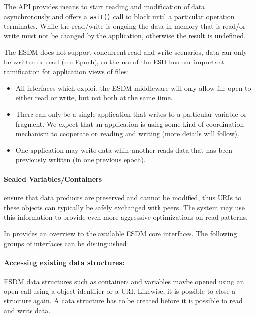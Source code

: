 The API provides means to start reading and modification of data asynchronously and offers a \texttt{wait()} call to block until a particular operation terminates.
While the read/write is ongoing the data in memory that is read/or write must not be changed by the application, otherwise the result is undefined.

The ESDM does not support concurrent read and write scenarios, data can only be written or read (see Epoch), so the use of the ESD has one important ramification for application views of files:
\begin{itemize}
\item All interfaces which exploit the ESDM middleware will only allow file open to either read or write, but not both at the same time.
\item There can only be a single application that writes to a particular variable or fragment.
We expect that an application is using some kind of coordination mechanism to cooperate on reading and writing (more details will follow).
\item One application may write data while another reads data that has been previously written (in one previous epoch).
\end{itemize}


\paragraph{Sealed Variables/Containers} ensure that data products are preserved and cannot be modified, thus URIs to these objects can typically be safely exchanged with peers.
The system may use this information to provide even more aggressive optimizations on read patterns.

\bigskip


In  provides an overview to the available ESDM core interfaces.
The following groups of interfaces can be distinguished:

\paragraph{Accessing existing data structures:}
ESDM data structures such as containers and variables maybe opened using an open call using a object identifier or a URI.
Likewise, it is possible to close a structure again.
A data structure has to be created before it is possible to read and write data.

